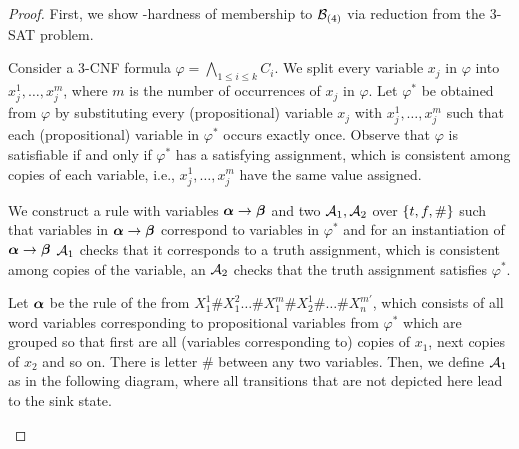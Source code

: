 
\NPHardness*
\begin{proof}
First, we show \NP-hardness of membership to $\mathcal{B}_{(4)}$ via reduction from the 3-SAT problem. 

Consider a 3-CNF formula $\varphi = \bigwedge_{1\leq i \leq k} C_i$. 
We split every variable $x_j$ in $\varphi$ into $x_j^1, \ldots, x_j^m$, where $m$ is the number of occurrences of $x_j$ in $\varphi$.
Let $\varphi^*$ be obtained from $\varphi$ by substituting every (propositional) variable $x_j$ with $x_j^1, \ldots, x_j^m$ such that each (propositional) variable in $\varphi^*$ occurs exactly once.
Observe that $\varphi$ is satisfiable if and only if $\varphi^*$ has a satisfying assignment, which is consistent among copies of each variable, i.e., 
$x_j^1, \ldots, x_j^m$ have the same value assigned. 

We construct a rule with variables $\boldsymbol{\alpha} \to \boldsymbol{\beta}$ and two \DFA $\mathcal{A}_1, \mathcal{A}_2$ over $\{t,f,\#\}$ 
such that variables in $\boldsymbol{\alpha} \to \boldsymbol{\beta}$ correspond to variables in $\varphi^*$ and for an instantiation of $\boldsymbol{\alpha} \to \boldsymbol{\beta}$ 
$\mathcal{A}_1$ checks that it corresponds to a truth assignment, which is consistent among copies of the variable, an
$\mathcal{A}_2$ checks that the truth assignment satisfies $\varphi^*$.

Let $\boldsymbol{\alpha}$ be the rule of the from $X_1^1 \# X_1^2 \ldots \# X_1^m \# X_2^1 \# \ldots \# X_n^{m'}$, which consists of all word variables corresponding to propositional variables from $\varphi^*$
which are grouped so that first are all (variables corresponding to) copies of $x_1$, next copies of $x_2$ and so on. There is letter $\#$ between any two variables. 
Then, we define $\mathcal{A}_1$ as in the following diagram, where all transitions that are not depicted here lead to the sink state.
\begin{figure}[h!]
\centering
{}
\end{figure}
\end{proof}
